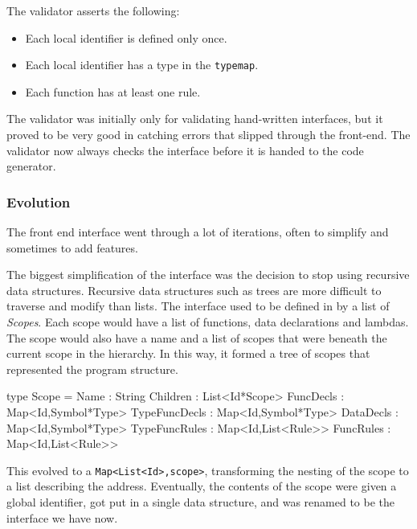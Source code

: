 The validator asserts the following:
\begin{itemize}
\item Each local identifier is defined only once.
\item Each local identifier has a type in the \texttt{typemap}.
\item Each function has at least one rule.
\end{itemize}

The validator was initially only for validating hand-written interfaces,
but it proved to be very good in catching errors that slipped through the front-end.
The validator now always checks the interface before it is handed to the code generator.

\subsubsection{Evolution}
The front end interface went through a lot of iterations, often to simplify and sometimes to add features.

The biggest simplification of the interface was the decision to stop using recursive data structures.
Recursive data structures such as trees are more difficult to traverse and modify than lists.
The interface used to be defined in by a list of \textit{Scopes}.
Each scope would have  a list of functions, data declarations and lambdas.
The scope would also have a name and a list of scopes that were beneath the current scope in the hierarchy.
In this way, it formed a tree of scopes that represented the program structure.

\begin{FS}
type Scope = {
  Name          : String
  Children      : List<Id*Scope>
  FuncDecls     : Map<Id,Symbol*Type>
  TypeFuncDecls : Map<Id,Symbol*Type>
  DataDecls     : Map<Id,Symbol*Type>
  TypeFuncRules : Map<Id,List<Rule>>
  FuncRules     : Map<Id,List<Rule>>
}
\end{FS}

This evolved to a \verb|Map<List<Id>,scope>|, transforming the nesting of the scope to a list describing the address.
Eventually, the contents of the scope were given a global identifier, got put in a single data structure, and was renamed to be the interface we have now.
